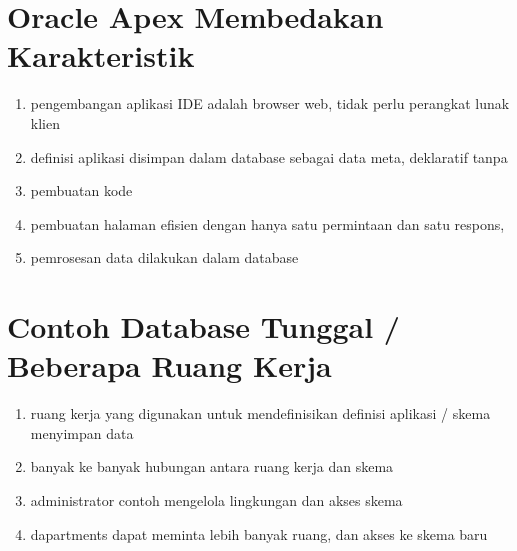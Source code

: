 \section{Oracle Apex Membedakan Karakteristik}
\begin{enumerate}
\item pengembangan aplikasi IDE adalah browser web, tidak perlu perangkat lunak klien
\item definisi aplikasi disimpan dalam database sebagai data meta, deklaratif tanpa \item pembuatan kode
\item pembuatan halaman efisien dengan hanya satu permintaan dan satu respons,
\item pemrosesan data dilakukan dalam database

\end{enumerate}

\section{Contoh Database Tunggal / Beberapa Ruang Kerja}
\begin{enumerate}
    \item ruang kerja yang digunakan untuk mendefinisikan definisi aplikasi / skema menyimpan data
  \item banyak ke banyak hubungan antara ruang kerja dan skema
  \item administrator contoh mengelola lingkungan dan akses skema
  \item dapartments dapat meminta lebih banyak ruang, dan akses ke skema baru
 
\end{enumerate}